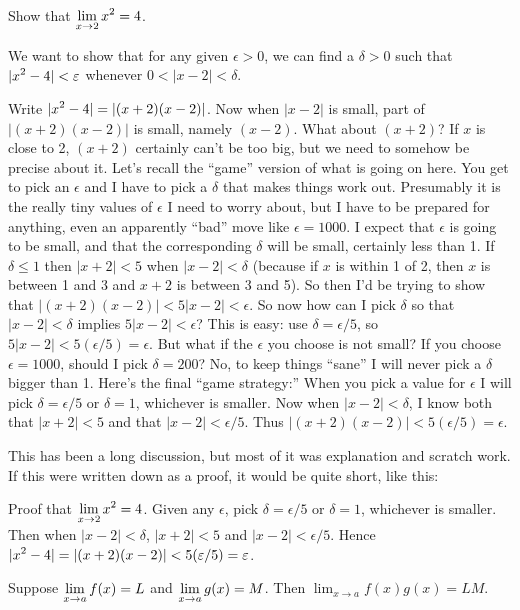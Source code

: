 \begin{example} Show that $\displaystyle \lim_{x\to 2} x^2=4$.
 
We want to show that for any given $\epsilon>0$, we can find a
$\delta>0$ such that $\displaystyle |x^2-4|<\varepsilon$ whenever $0<|x-2|<\delta$.

Write $\displaystyle |x^2-4|=|(x+2)(x-2)|$. Now when $|x-2|$ is small, part of
$|(x+2)(x-2)|$ is small, namely $(x-2)$. What about $(x+2)$? If $x$ is
close to 2, $(x+2)$ certainly can't be too big, but we need to somehow
be precise about it. Let's recall the ``game'' version of what is
going on here. You get to pick an $\epsilon$ and I have to pick a
$\delta$ that makes things work out. Presumably it is the really tiny
values of $\epsilon$ I need to worry about, but I have to be prepared
for anything, even an apparently ``bad'' move like $\epsilon=1000$.  I
expect that $\epsilon$ is going to be small, and that the
corresponding $\delta$ will be small, certainly less than 1.  If
$\delta\le 1$ then $|x+2|<5$ when $|x-2|<\delta$ (because if $x$ is
within 1 of 2, then $x$ is between 1 and 3 and $x+2$ is between 3 and
5). So then I'd be trying to show that
$|(x+2)(x-2)|<5|x-2|<\epsilon$. So now how can I pick $\delta$ so that
$|x-2|<\delta$ implies $5|x-2|<\epsilon$? This is easy: use
$\delta=\epsilon/5$, so $5|x-2|<5(\epsilon/5) = \epsilon$. But what if
the $\epsilon$ you choose is not small? If you choose $\epsilon=1000$,
should I pick $\delta=200$? No, to keep things ``sane'' I will never
pick a $\delta$ bigger than 1. Here's the final ``game strategy:''
When you pick a value for $\epsilon$ I will pick $\delta=\epsilon/5$
or $\delta=1$, whichever is smaller. Now when $|x-2|<\delta$, I know
both that $|x+2|<5$ and that $|x-2|<\epsilon/5$. Thus
$|(x+2)(x-2)|<5(\epsilon/5) = \epsilon$.

This has been a long discussion, but most of it was explanation and
scratch work. If this were written down as a proof, it would be quite
short, like this:

Proof that $\displaystyle \lim_{x\to 2}x^2=4$. Given any $\epsilon$, pick
$\delta=\epsilon/5$ or $\delta=1$, whichever is smaller. Then when
$|x-2|<\delta$, $|x+2|<5$ and
$|x-2|<\epsilon/5$. Hence $\displaystyle |x^2-4|=|(x+2)(x-2)|<5(\varepsilon/5) =
\varepsilon$. 
\end{example}




\begin{theorem} 
Suppose $\displaystyle \lim_{x\to a} f(x)=L$ and $\displaystyle \lim_{x\to a}g(x)=M$. Then
$\lim_{x\to a} f(x)g(x) = LM$.
\end{theorem}

